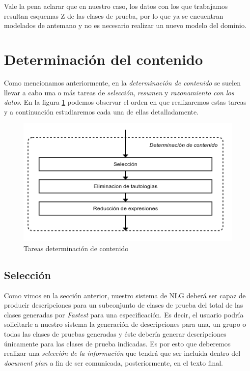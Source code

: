 Vale la pena aclarar que en nuestro caso, los datos con los que trabajamos resultan esquemas Z de las clases de prueba, por lo que ya se encuentran modelados de antemano y no es necesario realizar un nuevo modelo del dominio.
 

\section{Determinación del contenido}
\label{cap:determinacion_contenido}

Como mencionamos anteriormente, en la \emph{determinación de contenido} se suelen llevar a cabo una o más tareas de \emph{selección}, \emph{resumen} y \emph{razonamiento con los datos}. En la figura \ref{fig:tareas_determinacion_contenido} podemos observar el orden en que realizaremos estas tareas y a continuación estudiaremos cada una de ellas detalladamente.

\begin{figure}[H]
  	\centering
	\includegraphics[scale=0.4]{img/tareas_determinacion_contenido.png}
	\caption{Tareas determinación de contenido}
  	\label{fig:tareas_determinacion_contenido}
\end{figure}

\subsection*{Selección}
Como vimos en la sección anterior, nuestro sistema de NLG deberá ser capaz de producir descripciones para un subconjunto de clases de prueba del total de las clases generadas por \emph{Fastest} para una especificación. Es decir, el usuario podría solicitarle a nuestro sistema la generación de descripciones para una, un grupo o todas las clases de pruebas generadas y éste debería generar descripciones únicamente para las clases de prueba indicadas. Es por esto que deberemos realizar una \emph{selección de la información} que tendrá que ser incluida dentro del \textit{document plan} a fin de ser comunicada, posteriormente, en el texto final.

